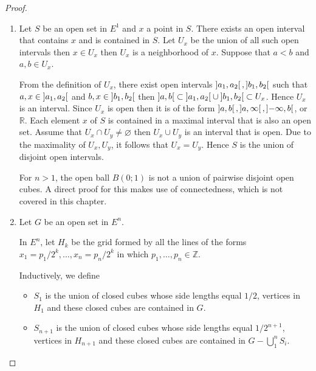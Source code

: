 \begin{proof}
	\begin{enumerate}[label={(\alph*)}]
		\item Let \( S \) be an open set in \( E^{1} \) and \( x \) a point in \( S \). There exists an open interval that contains \( x \) and is contained in \( S \). Let \( U_{x} \) be the union of all such open intervals then \( x \in U_{x} \) then \( U_{x} \) is a neighborhood of \( x \). Suppose that \( a < b \) and \( a, b \in U_{x} \).

		      From the definition of \( U_{x} \), there exist open intervals \( \left\rbrack{a_{1}, a_{2}}\right\lbrack, \left\rbrack{b_{1}, b_{2}}\right\lbrack \) such that \( a, x \in \left\rbrack{a_{1}, a_{2}}\right\lbrack \) and \( b, x \in \left\rbrack{b_{1}, b_{2}}\right\lbrack \) then \( \left\rbrack{a, b}\right\lbrack \subset \left\rbrack{a_{1}, a_{2}}\right\lbrack \cup \left\rbrack{b_{1}, b_{2}}\right\lbrack \subset U_{x} \). Hence \( U_{x} \) is an interval. Since \( U_{x} \) is open then it is of the form \( \left\rbrack{a, b}\right\lbrack, \left\rbrack{a, \infty}\right\lbrack, \left\rbrack{-\infty, b}\right\lbrack \), or \( \mathbb{R} \). Each element \( x \) of \( S \) is contained in a maximal interval that is also an open set. Assume that \( U_{x} \cap U_{y} \ne \varnothing \) then \( U_{x} \cup U_{y} \) is an interval that is open. Due to the maximality of \( U_{x}, U_{y} \), it follows that \( U_{x} = U_{y} \). Hence \( S \) is the union of disjoint open intervals.

		      For \( n > 1 \), the open ball \( B(0; 1) \) is not a union of pairwise disjoint open cubes. A direct proof for this makes use of connectedness, which is not covered in this chapter.
		\item Let \(G\) be an open set in \( E^{n} \).

		      In \( E^{n} \), let \( H_{k} \) be the grid formed by all the lines of the forms \( x_{1} = p_{1}/2^{k}, \ldots, x_{n} = p_{n}/2^{k} \) in which \( p_{1}, \ldots, p_{n} \in \mathbb{Z} \).

		      Inductively, we define
		      \begin{itemize}
			      \item \( S_{1} \) is the union of closed cubes whose side lengths equal \( 1/2 \), vertices in \( H_{1} \) and these closed cubes are contained in \( G \).
			      \item \( S_{n+1} \) is the union of closed cubes whose side lengths equal \( 1/2^{n+1} \), vertices in \( H_{n+1} \) and these closed cubes are contained in \( G - \bigcup^{n}_{1}S_{i} \).
		      \end{itemize}


\end{enumerate}
\end{proof}
